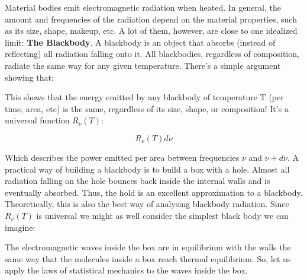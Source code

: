\documentclass{article}
\newcommand{\brad}{R_{\nu}(T)}
\begin{document}
Material bodies emit electromagnetic radiation when heated.  In general, the amount and frequencies of the radiation depend on the material properties, such as its size, shape, makeup, etc.  A lot of them, however, are close to one idealized limit: \textbf{The Blackbody}.  A blackbody is an object that absorbs (instead of reflecting) all radiation falling onto it.  All blackbodies, regardless of composition, radiate the same way for any given temperature.  There's a simple argument showing that:


This shows that the energy emitted by any blackbody of temperature T (per time, area, etc) is the same, regardless of its size, shape, or composition!  It's a universal function $R_{\nu}(T)$:

$$R_{\nu}(T)d\nu$$

Which describes the power emitted per area between frequencies $\nu$ and $\nu+d\nu$.  A practical way of building a blackbody is to build a box with a hole.  Almost all radiation falling on the hole bounces back inside the internal walls and is eventually absorbed.  Thus, the hold is an excellent approximation to a blackbody.  Theoretically, this is also the best way of analysing blackbody radiation.  Since $\brad$ is universal we might as well consider the simplest black body we can imagine:


The electromagnetic waves inside the box are in equilibrium with the walls the same way that the molecules inside a box reach thermal equilibrium.  So, let us apply the laws of statistical mechanics to the waves inside the box.    
\end{document}
